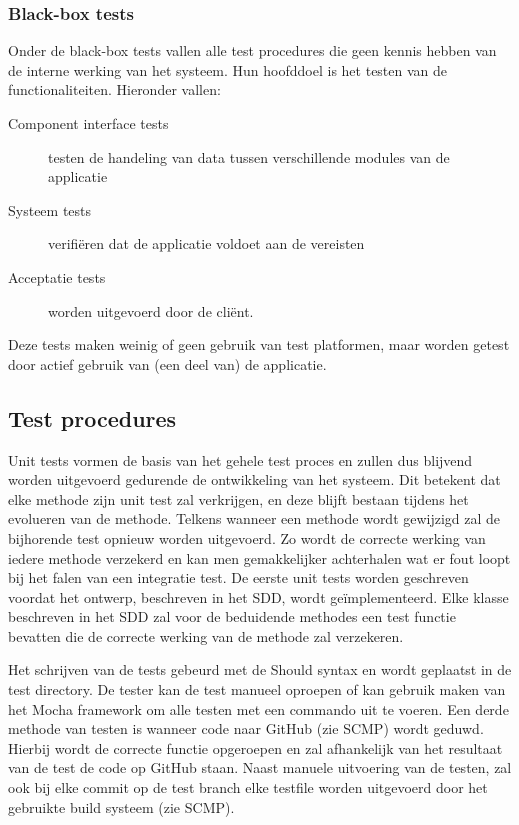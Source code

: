 \documentclass[a4paper]{article}
\begin{document}
\subsubsection{Black-box tests}

Onder de black-box tests vallen alle test procedures die geen kennis hebben van de interne werking van het systeem. Hun hoofddoel is het testen van de functionaliteiten.
Hieronder vallen:

\begin{description}

\item[Component interface tests] testen de handeling van data tussen verschillende modules van de applicatie
\item[Systeem tests] verifiëren dat de applicatie voldoet aan de vereisten
\item[Acceptatie tests] worden uitgevoerd door de cliënt.

\end{description}

Deze tests maken weinig of geen gebruik van test platformen, maar worden getest door actief gebruik van (een deel van) de applicatie.

\subsection{Test procedures}

Unit tests vormen de basis van het gehele test proces en zullen dus blijvend worden uitgevoerd gedurende de ontwikkeling van het systeem. Dit betekent dat elke methode zijn unit test zal verkrijgen, en deze blijft bestaan tijdens het evolueren van de methode. Telkens wanneer een methode wordt gewijzigd zal de bijhorende test opnieuw worden uitgevoerd. Zo wordt de correcte werking van iedere methode verzekerd en kan men gemakkelijker achterhalen wat er fout loopt bij het falen van een integratie test.
De eerste unit tests worden geschreven voordat het ontwerp, beschreven in het SDD, wordt geïmplementeerd. Elke klasse beschreven in het SDD zal voor de beduidende methodes een test functie bevatten die de correcte werking van de methode zal verzekeren.\newline

Het schrijven van de tests gebeurd met de Should syntax en wordt geplaatst in de test directory. De tester kan de test manueel oproepen of kan gebruik maken van het Mocha framework om alle testen met een commando uit te voeren. Een derde methode van testen is wanneer code naar GitHub (zie SCMP) wordt geduwd. Hierbij wordt de correcte functie opgeroepen en zal afhankelijk van het resultaat van de test de code op GitHub staan. Naast manuele uitvoering van de testen, zal ook bij elke commit op de test branch elke testfile worden uitgevoerd door het gebruikte build systeem (zie SCMP). \newline
\end{document}

